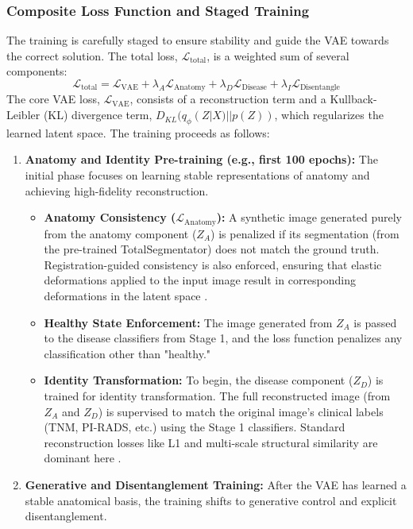 \documentclass[11pt, a4paper]{article}
\begin{document}
\subsubsection{Composite Loss Function and Staged Training}
The training is carefully staged to ensure stability and guide the VAE towards the correct solution. The total loss, $\mathcal{L}_{\text{total}}$, is a weighted sum of several components:
$$ \mathcal{L}_{\text{total}} = \mathcal{L}_{\text{VAE}} + \lambda_A \mathcal{L}_{\text{Anatomy}} + \lambda_D \mathcal{L}_{\text{Disease}} + \lambda_I \mathcal{L}_{\text{Disentangle}} $$
The core VAE loss, $\mathcal{L}_{\text{VAE}}$, consists of a reconstruction term and a Kullback-Leibler (KL) divergence term, $D_{KL}(q_{\phi}(Z|X)||p(Z))$, which regularizes the learned latent space. The training proceeds as follows:
\begin{enumerate}
    \item \textbf{Anatomy and Identity Pre-training (e.g., first 100 epochs):} The initial phase focuses on learning stable representations of anatomy and achieving high-fidelity reconstruction.
    \begin{itemize}
        \item \textbf{Anatomy Consistency ($\mathcal{L}_{\text{Anatomy}}$):} A synthetic image generated purely from the anatomy component ($Z_A$) is penalized if its segmentation (from the pre-trained TotalSegmentator) does not match the ground truth. Registration-guided consistency is also enforced, ensuring that elastic deformations applied to the input image result in corresponding deformations in the latent space \cite{LiChen2024}.
        \item \textbf{Healthy State Enforcement:} The image generated from $Z_A$ is passed to the disease classifiers from Stage 1, and the loss function penalizes any classification other than "healthy."
        \item \textbf{Identity Transformation:} To begin, the disease component ($Z_D$) is trained for identity transformation. The full reconstructed image (from $Z_A$ and $Z_D$) is supervised to match the original image's clinical labels (TNM, PI-RADS, etc.) using the Stage 1 classifiers. Standard reconstruction losses like L1 and multi-scale structural similarity are dominant here \cite{FerreiraLi2024, KhojasteSarakhsiHaghighi2024}.
    \end{itemize}
    \item \textbf{Generative and Disentanglement Training:} After the VAE has learned a stable anatomical basis, the training shifts to generative control and explicit disentanglement.

\end{enumerate}
\end{document}
